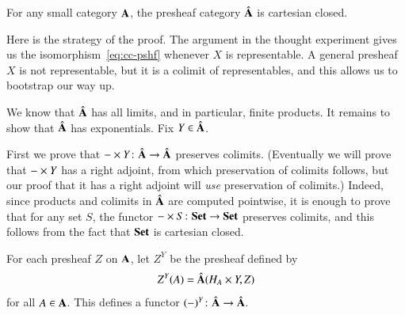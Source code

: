 \begin{thm}
\label{thm:pshf-cc}
For any small category $\mathbf{A}$, the presheaf%
%
%
 category $\hat{\mathbf{A}}$
is cartesian closed.
\end{thm}
%
Here is the strategy of the proof.  The argument in the thought experiment
gives us the isomorphism~\eqref{eq:cc-pshf} whenever $X$ is representable.
A general presheaf $X$ is not representable, but it is a colimit of
representables, and this allows us to bootstrap our way up.

\begin{pf}
We know that $\hat{\mathbf{A}}$ has all limits, and in particular, finite
products.  It remains to show that $\hat{\mathbf{A}}$ has exponentials.  Fix
$Y \in \hat{\mathbf{A}}$.

First we prove that $\dashbk \times Y\from \psh{\scat{A}} \to
\psh{\scat{A}}$ preserves colimits.  (Eventually we will prove that
$-\times Y$ has a right adjoint, from which preservation of colimits
follows, but our proof that it has a right adjoint will \emph{use}
preservation of colimits.)  Indeed, since products and colimits in
$\hat{\mathbf{A}}$ are computed pointwise, it is enough to prove that for any
set $S$, the functor $\dashbk \times S\from \Set \to \Set$ preserves
colimits, and this follows from the fact that $\mathbf{Set}$ is cartesian closed.

For each presheaf $Z$ on $\mathbf{A}$, let $Z^Y$ be the presheaf defined by
\[
Z^Y (A) = \hat{\mathbf{A}} (H_A \times Y, Z)
\]
for all $A \in \mathbf{A}$.  This defines a functor $(\dashbk)^Y \from
\psh{\scat{A}} \to \psh{\scat{A}}$.


\end{pf}
